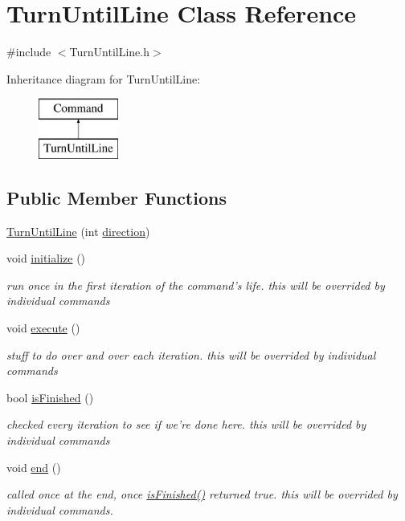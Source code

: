 \hypertarget{classTurnUntilLine}{\section{Turn\-Until\-Line Class Reference}
\label{classTurnUntilLine}
}


{\ttfamily \#include $<$Turn\-Until\-Line.\-h$>$}

Inheritance diagram for Turn\-Until\-Line\-:\begin{figure}[H]
\begin{center}
\leavevmode
\includegraphics[height=2.000000cm]{classTurnUntilLine}
\end{center}
\end{figure}
\subsection*{Public Member Functions}
\begin{DoxyCompactItemize}
\item 
\hyperlink{classTurnUntilLine_a737bfe72e0d4dbcce9f91182e319d28d}{Turn\-Until\-Line} (int \hyperlink{classTurnUntilLine_ac7e62d06dece2d456f9ea6e987b480cf}{direction})
\item 
void \hyperlink{classTurnUntilLine_a99e42f7512b95097df29633877e72cbd}{initialize} ()
\begin{DoxyCompactList}\small\item\em run once in the first iteration of the command's life. this will be overrided by individual commands \end{DoxyCompactList}\item 
void \hyperlink{classTurnUntilLine_a90feb7840ebc51984e4d0a31383ec5a9}{execute} ()
\begin{DoxyCompactList}\small\item\em stuff to do over and over each iteration. this will be overrided by individual commands \end{DoxyCompactList}\item 
bool \hyperlink{classTurnUntilLine_ad9232508d735c78d6443958fe2f18002}{is\-Finished} ()
\begin{DoxyCompactList}\small\item\em checked every iteration to see if we're done here. this will be overrided by individual commands \end{DoxyCompactList}\item 
void \hyperlink{classTurnUntilLine_a769864873e706e0ca6701eac7f947ede}{end} ()
\begin{DoxyCompactList}\small\item\em called once at the end, once \hyperlink{classTurnUntilLine_ad9232508d735c78d6443958fe2f18002}{is\-Finished()} returned true. this will be overrided by individual commands. \end{DoxyCompactList}\end{DoxyCompactItemize}
